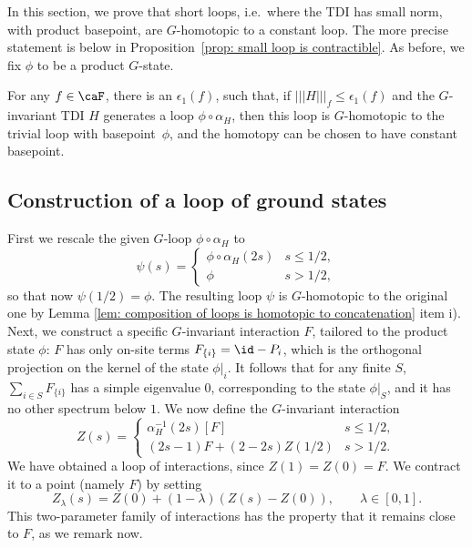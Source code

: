 In this section, we prove that short loops, i.e.\ where the TDI has small norm, with product basepoint, are $G$-homotopic to a constant loop. The more precise statement is below in Proposition~\ref{prop: small loop is contractible}.  As before, we fix $\phi$ to be a product $G$-state.
%
%
%
\begin{proposition}\label{prop: small loop is contractible}
	For any $f\in\caF$, there is an $\epsilon_1(f)$, such that, if $|||H|||_f\leq \epsilon_1(f)$ and the $G$-invariant TDI $H$ generates a loop $\phi\circ\alpha_H$, then this loop is $G$-homotopic to the trivial loop with basepoint~$\phi$, and the homotopy can be chosen to have constant basepoint. 
\end{proposition}
%
%
%
%
%
%
\subsection{Construction of a loop of ground states}\label{sec: construction of loop of gs}
First we rescale the given $G$-loop $\phi\circ\alpha_H$ to
\begin{equation}\label{Rescaled loop}
	\psi(s)=\begin{cases}  \phi\circ\alpha_H(2s)  &  s\leq 1/2, \\  
		\phi &   s>1/2,
	\end{cases}
\end{equation}
so that now $\psi(1/2)=\phi$. The resulting loop $\psi$ is $G$-homotopic to the original one by Lemma \ref{lem: composition of loops is homotopic to concatenation} item i).  Next, we construct a specific $G$-invariant interaction $F$, tailored to the product state $\phi$:
$F$ has only on-site terms $F_{\{i\}}= \id-P_i$, which is the orthogonal projection on the kernel of the state $\phi|_i$. It follows that for any finite $S$, $\sum_{i \in S} F_{\{i\}}$ has a simple eigenvalue $0$, corresponding to the state $\phi|_S$, and it has no other spectrum below $1$.  
We now define the $G$-invariant interaction
$$
Z(s)= \begin{cases}  \alpha^{-1}_H(2s)[F] & s \leq 1/2,  \\[2mm]
	(2s-1)F+    (2-2s)Z(1/2)   & s >1/2.
\end{cases}
$$
We have obtained a loop of interactions, since $Z(1)=Z(0)=F$. We contract it to a point (namely $F$) by setting
$$
Z_{\lambda}(s)  =Z(0)+ (1-\lambda)( Z(s)-Z(0)), \qquad  \lambda \in [0,1].
$$ 
This two-parameter family of interactions has the property that it remains close to $F$, as we remark now. 
